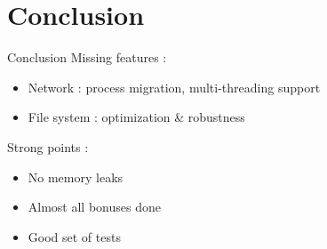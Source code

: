\documentclass{beamer}
\begin{document}
\section{Conclusion}
\begin{frame}{Conclusion}
    Missing features :
    \begin{itemize}
        \item Network : process migration, multi-threading support
        \item File system : optimization \& robustness
    \end{itemize}

    Strong points :
    \begin{itemize}
        \item No memory leaks
        \item Almost all bonuses done
        \item Good set of tests
    \end{itemize}
\end{frame}
\end{document}
